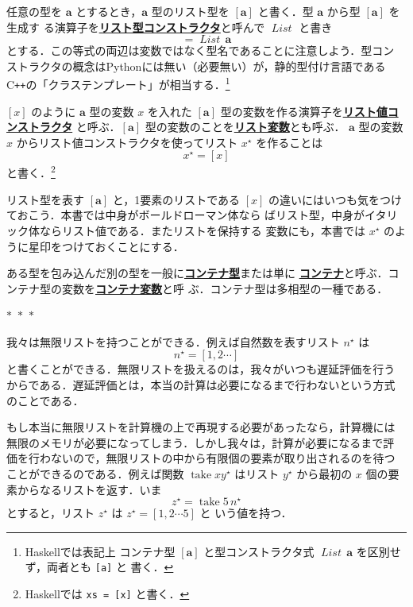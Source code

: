 \documentclass[a5paper,twoside,fleqn,draft]{jsbook}
\newcommand{\separator}{\begin{center}$*$~$*$~$*$\end{center}}
\newcommand{\programminglanguage}[1]{\textsf{#1}}
\newcommand{\cxx}{\programminglanguage{C}\texttt{++}}
\newcommand{\haskell}{\programminglanguage{Haskell}}
\newcommand{\python}{\programminglanguage{Python}}
\newcommand{\keyword}[1]{{\underline{\textbf{#1}}}}
\newcommand{\code}[1]{\texttt{#1}}
\newcommand{\mEmptyList}{{[\,]}}
\newcommand{\mSpecialFunc}[1]{\mathrm{#1}}
\DeclareMathOperator{\mTake}{\mSpecialFunc{take}}
\DeclareMathOperator{\mAppend}{\oplus}
\newcommand{\mType}[1]{\mathbf{#1}}
\newcommand{\mListType}[1]{[\mType{#1}]}
\newcommand{\mTypeConstructor}[1]{\textit{#1}}
\DeclareMathOperator{\mListTypeConstructor}{\mTypeConstructor{List}}
\newcommand{\mListWith}[1]{\left[#1\right]}
\newcommand{\mTupleWith}[1]{\left(#1\right)}
\newcommand{\mList}[1]{{#1}^\mathrm{\star}}
\begin{document}
任意の型を $\mType{a}$ とするとき，$\mType{a}$ 型のリスト型を
$\mListType{a}$ と書く．型 $\mType{a}$ から型 $\mListType{a}$ を生成す
る演算子を\keyword{リスト型コンストラクタ}と呼んで
$\mListTypeConstructor$ と書き
\begin{equation}
\mListType{a}=\mListTypeConstructor\,\mType{a}
\end{equation}
とする．この等式の両辺は変数ではなく型名であることに注意しよう．型コン
ストラクタの概念は\python には無い（必要無い）が，静的型付け言語である
\cxx の「クラステンプレート」が相当する．\footnote{\haskell では表記上
  コンテナ型 $\mListType{a}$ と型コンストラクタ式
  $\mListTypeConstructor\,\mType{a}$ を区別せず，両者とも \code{[a]} と
  書く．}

$\mListWith{x}$ のように $\mType{a}$ 型の変数 $x$ を入れた
$\mListType{a}$ 型の変数を作る演算子を\keyword{リスト値コンストラクタ}
と呼ぶ．$\mListType{a}$ 型の変数のことを\keyword{リスト変数}とも呼ぶ．
$\mType{a}$ 型の変数 $x$ からリスト値コンストラクタを使ってリスト
$\mList{x}$ を作ることは
\begin{equation}
\mList{x}=\mListWith{x}
\end{equation}
と書く．\footnote{\haskell では \code{xs = [x]} と書く．}

リスト型を表す $\mListType{a}$ と，1要素のリストである $\mListWith{x}$
の違いにはいつも気をつけておこう．本書では中身がボールドローマン体なら
ばリスト型，中身がイタリック体ならリスト値である．またリストを保持する
変数にも，本書では $\mList{x}$ のように星印をつけておくことにする．

ある型を包み込んだ別の型を一般に\keyword{コンテナ型}または単に
\keyword{コンテナ}と呼ぶ．コンテナ型の変数を\keyword{コンテナ変数}と呼
ぶ．コンテナ型は多相型の一種である．


\separator

我々は無限リストを持つことができる．例えば自然数を表すリスト
$\mList{n}$ は
\begin{equation*}
\mList{n}=\mListWith{1,2\dotsb}
\end{equation*}
と書くことができる．無限リストを扱えるのは，我々がいつも遅延評価を行う
からである．遅延評価とは，本当の計算は必要になるまで行わないという方式
のことである．

もし本当に無限リストを計算機の上で再現する必要があったなら，計算機には
無限のメモリが必要になってしまう．しかし我々は，計算が必要になるまで評
価を行わないので，無限リストの中から有限個の要素が取り出されるのを待つ
ことができるのである．例えば関数 $\mTake x\mList{y}$ はリスト
$\mList{y}$ から最初の $x$ 個の要素からなるリストを返す．いま
\begin{equation*}
\mList{z}=\mTake5\,\mList{n}
\end{equation*}
とすると，リスト $\mList{z}$ は $\mList{z}=\mListWith{1,2\dotsb5}$ と
いう値を持つ．
\end{document}
